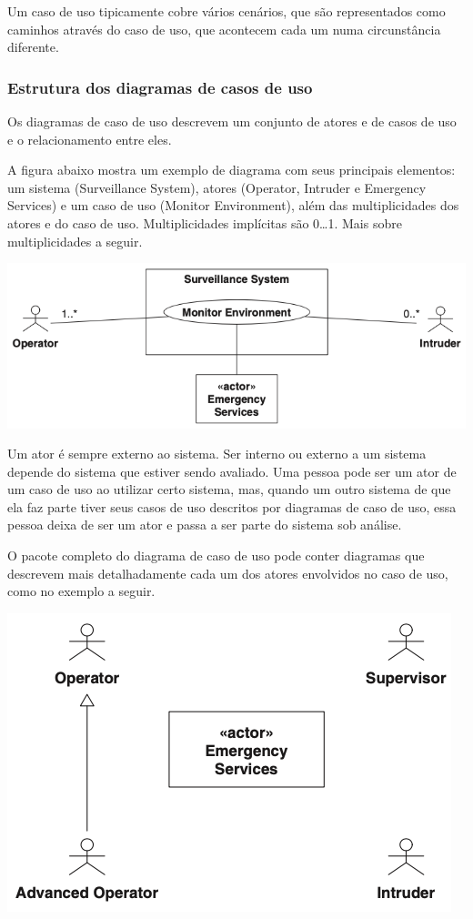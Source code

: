 Um caso de uso tipicamente cobre vários cenários, que são representados como caminhos através do caso de uso, que acontecem cada um numa circunstância diferente.

\subsubsection{Estrutura dos diagramas de casos de uso}
Os diagramas de caso de uso descrevem um conjunto de atores e de casos de uso e o relacionamento entre eles.

A figura abaixo mostra um exemplo de diagrama com seus principais elementos: um sistema (Surveillance System), atores (Operator, Intruder e Emergency Services) e um caso de uso (Monitor Environment), além das multiplicidades dos atores e do caso de uso. Multiplicidades implícitas são 0…1. Mais sobre multiplicidades a seguir.

\includegraphics[width=\textwidth,height=\textheight,keepaspectratio]{figures/diagrama-caso-de-uso-1.png}

Um ator é sempre externo ao sistema. Ser interno ou externo a um sistema depende do sistema que estiver sendo avaliado. Uma pessoa pode ser um ator de um caso de uso ao utilizar certo sistema, mas, quando um outro sistema de que ela faz parte tiver seus casos de uso descritos por diagramas de caso de uso, essa pessoa deixa de ser um ator e passa a ser parte do sistema sob análise.

O pacote completo do diagrama de caso de uso pode conter diagramas que descrevem mais detalhadamente cada um dos atores envolvidos no caso de uso, como no exemplo a seguir.

\includegraphics[width=\textwidth,height=\textheight,keepaspectratio]{figures/diagrama-caso-de-uso-2.png}

